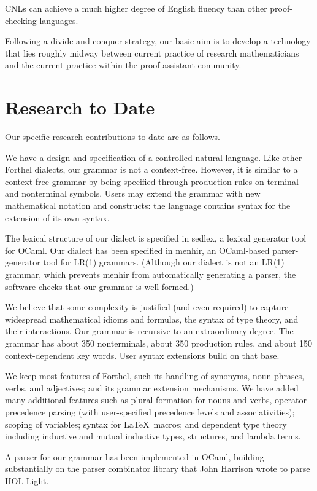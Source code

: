 \documentclass{easychair}
\renewcommand{\~}{\ }
\renewcommand{\_}{\textunderscore}
\begin{document}
CNLs can achieve a much higher degree of English fluency than other
proof-checking languages.  


Following a divide-and-conquer strategy, our
basic aim is to develop a technology that lies roughly midway
between current practice of research mathematicians and the current
practice within the proof assistant community.  

\section{Research to Date}

Our specific research contributions to date are as follows.

We have a design and specification of a controlled natural
language.
Like other Forthel dialects, our grammar is not a context-free.
However, it is similar to a context-free grammar by being specified through
production rules on terminal and nonterminal symbols.
Users may extend the grammar with new mathematical notation
and constructs:  the language
contains syntax for the extension of its own syntax. 

The lexical structure of our dialect is specified in sedlex, a lexical
generator tool for OCaml.
Our dialect has been specified in menhir, an OCaml-based
parser-generator tool for LR(1) grammars.  (Although our dialect is
not an LR(1) grammar, which prevents menhir from automatically
generating a parser, the software checks that our grammar is well-formed.)

We believe that some complexity is justified (and even required) to
capture widespread mathematical idioms and formulas, the syntax of type
theory, and their
interactions. Our grammar is recursive to an extraordinary degree.
The grammar has about 350 nonterminals, about 350 production
rules, and about 150 context-dependent key words.   User syntax
extensions build on that base.

We keep most features of Forthel, such its handling of synonyms, noun
phrases, verbs, and adjectives; and its grammar extension mechanisms.
We have added many additional features such as plural formation for nouns and verbs,
operator precedence parsing (with
user-specified precedence levels and associativities); scoping of variables;
syntax for \LaTeX\ macros; and dependent type theory including
inductive and mutual inductive types, structures, and lambda
terms.

A parser for our grammar has been implemented in OCaml, building substantially on
the parser combinator library that John Harrison wrote to parse HOL
Light.   
\end{document}
